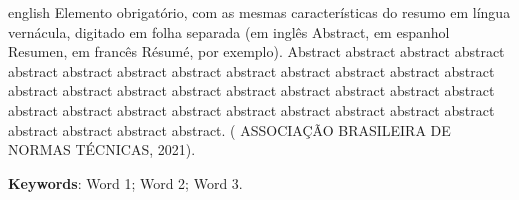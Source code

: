 \begin{resumo}[Abstract]			%
\begin{otherlanguage*}{english}		%
Elemento obrigatório, com as mesmas características do resumo em língua 
vernácula, digitado em folha separada (em inglês Abstract, em espanhol Resumen, 
em francês Résumé, por exemplo). Abstract abstract abstract abstract abstract 
abstract abstract abstract abstract abstract abstract abstract abstract abstract 
abstract abstract abstract abstract abstract abstract abstract abstract abstract 
abstract abstract abstract abstract abstract abstract abstract abstract abstract 
abstract abstract abstract. ( ASSOCIAÇÃO BRASILEIRA DE NORMAS TÉCNICAS, 2021). 

\vspace{\onelineskip}
\noindent
\textbf{Keywords}: Word 1; Word 2; Word 3.
\end{otherlanguage*}
\end{resumo}

% 

%  
